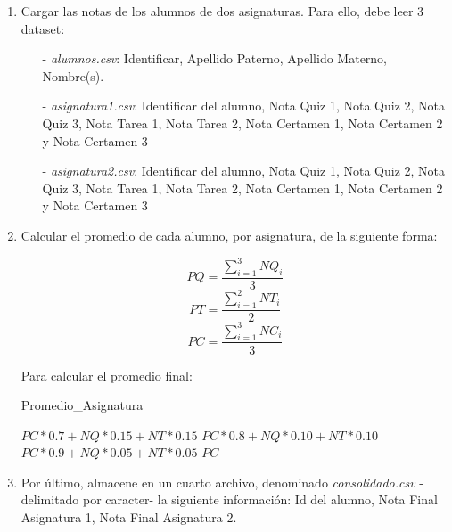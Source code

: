 \documentclass[10pt]{article}
\begin{document}
{\begin{enumerate}
        \begin{enumerate}
            \item Cargar las notas de los alumnos de dos asignaturas. Para ello, debe leer 3 dataset: 
            \begin{itemize}
                \item[-] \emph{alumnos.csv}: Identificar, Apellido Paterno, Apellido Materno, Nombre(s).
                \item[-] \emph{asignatura1.csv}: Identificar del alumno, Nota Quiz 1, Nota Quiz 2, Nota Quiz 3, Nota Tarea 1, Nota Tarea 2, Nota Certamen 1, Nota Certamen 2 y Nota Certamen 3
                \item[-] \emph{asignatura2.csv}: Identificar del alumno, Nota Quiz 1, Nota Quiz 2, Nota Quiz 3, Nota Tarea 1, Nota Tarea 2, Nota Certamen 1, Nota Certamen 2 y Nota Certamen 3
            \end{itemize}
            \item Calcular el promedio de cada alumno, por asignatura, de la siguiente forma:
            \begin{multicols}{3}
                $$PQ = \frac{\displaystyle\sum_{i=1}^{3}NQ_{i}}{3}$$
                $$PT = \frac{\displaystyle\sum_{i=1}^{2}NT_{i}}{2}$$
                $$PC = \frac{\displaystyle\sum_{i=1}^{3}NC_{i}}{3}$$
            \end{multicols}
            Para calcular el promedio final:
                \begin{algorithm}[!ht]
                	    \caption{Promedio\_Asignatura}
                    \begin{algorithmic}%
                            \RETURN $PC * 0.7 + NQ * 0.15 + NT * 0.15$
                            \RETURN $PC * 0.8 + NQ * 0.10 + NT * 0.10$
                            \RETURN $PC * 0.9 + NQ * 0.05 + NT * 0.05$
                        \ELSE
                            \RETURN $PC$
                        \ENDIF
                    \end{algorithmic}
                \end{algorithm}	
            \item Por \'ultimo, almacene en un cuarto archivo, denominado \emph{consolidado.csv} -delimitado por caracter- la siguiente informaci\'on: Id del alumno, Nota Final Asignatura 1, Nota Final Asignatura 2.
        \end{enumerate}
	\end{enumerate}}
\end{document}
